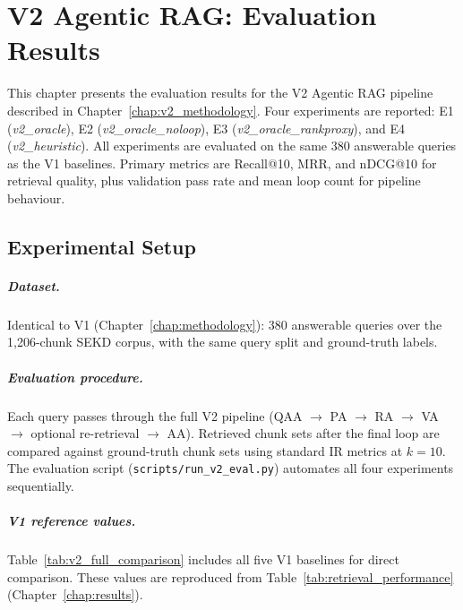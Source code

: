 
\chapter{V2 Agentic RAG: Evaluation Results}
\label{chap:v2_results}

This chapter presents the evaluation results for the V2 Agentic RAG pipeline described in Chapter~\ref{chap:v2_methodology}. Four experiments are reported: E1 (\textit{v2\_oracle}), E2 (\textit{v2\_oracle\_noloop}), E3 (\textit{v2\_oracle\_rankproxy}), and E4 (\textit{v2\_heuristic}). All experiments are evaluated on the same 380 answerable queries as the V1 baselines. Primary metrics are Recall@10, MRR, and nDCG@10 for retrieval quality, plus validation pass rate and mean loop count for pipeline behaviour.

\section{Experimental Setup}
\label{sec:v2_setup}

\paragraph{Dataset.} Identical to V1 (Chapter~\ref{chap:methodology}): 380 answerable queries over the 1,206-chunk SEKD corpus, with the same query split and ground-truth labels.

\paragraph{Evaluation procedure.} Each query passes through the full V2 pipeline (QAA $\to$ PA $\to$ RA $\to$ VA $\to$ optional re-retrieval $\to$ AA). Retrieved chunk sets after the final loop are compared against ground-truth chunk sets using standard IR metrics at $k{=}10$. The evaluation script (\texttt{scripts/run\_v2\_eval.py}) automates all four experiments sequentially.

\paragraph{V1 reference values.} Table~\ref{tab:v2_full_comparison} includes all five V1 baselines for direct comparison. These values are reproduced from Table~\ref{tab:retrieval_performance} (Chapter~\ref{chap:results}).


